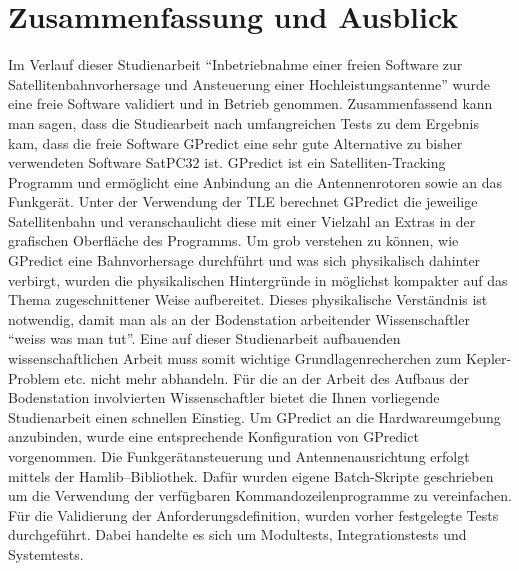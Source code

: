 
\chapter{Zusammenfassung und Ausblick}
Im Verlauf dieser Studienarbeit "`Inbetriebnahme einer freien Software zur Satellitenbahnvorhersage und Ansteuerung einer Hochleistungsantenne"' wurde eine freie Software validiert und in Betrieb genommen. Zusammenfassend kann man sagen, dass die Studiearbeit nach umfangreichen Tests zu dem Ergebnis kam, dass die freie Software GPredict eine sehr gute Alternative zu bisher verwendeten Software SatPC32 ist.\newpar
GPredict ist ein Satelliten-Tracking Programm und ermöglicht eine Anbindung an die Antennenrotoren sowie 
an das Funkgerät. Unter der Verwendung der \ac{TLE} berechnet GPredict die jeweilige Satellitenbahn und veranschaulicht diese mit einer Vielzahl an Extras in der grafischen Oberfläche des Programms. Um grob verstehen zu können, wie GPredict eine Bahnvorhersage durchführt und was sich physikalisch dahinter verbirgt, wurden die physikalischen Hintergründe in möglichst kompakter auf das Thema zugeschnittener Weise aufbereitet. Dieses physikalische Verständnis ist notwendig, damit man als an der Bodenstation arbeitender Wissenschaftler "`weiss was man tut"'. Eine auf dieser Studienarbeit aufbauenden wissenschaftlichen Arbeit muss somit wichtige Grundlagenrecherchen zum Kepler-Problem etc. nicht mehr abhandeln. Für die an der Arbeit des Aufbaus der Bodenstation involvierten Wissenschaftler bietet die Ihnen vorliegende Studienarbeit einen schnellen Einstieg.\newpar
Um GPredict an die Hardwareumgebung anzubinden, wurde eine entsprechende Konfiguration von GPredict vorgenommen. Die Funkgerätansteuerung und Antennenausrichtung erfolgt mittels der Hamlib--Bibliothek. Dafür wurden eigene Batch-Skripte geschrieben um die Verwendung der verfügbaren Kommandozeilenprogramme zu vereinfachen.\newpar
Für die Validierung der Anforderungsdefinition, wurden vorher festgelegte Tests durchgeführt. Dabei handelte es sich um Modultests, Integrationstests und Systemtests.\newpar
